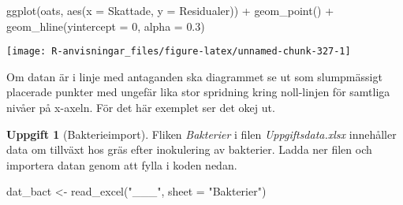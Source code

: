 \documentclass[
]{book}
\newenvironment{Shaded}{\begin{snugshade}}{\end{snugshade}}
\newcommand{\AttributeTok}[1]{\textcolor[rgb]{0.77,0.63,0.00}{#1}}
\newcommand{\DecValTok}[1]{\textcolor[rgb]{0.00,0.00,0.81}{#1}}
\newcommand{\FloatTok}[1]{\textcolor[rgb]{0.00,0.00,0.81}{#1}}
\newcommand{\FunctionTok}[1]{\textcolor[rgb]{0.00,0.00,0.00}{#1}}
\newcommand{\NormalTok}[1]{#1}
\newcommand{\OtherTok}[1]{\textcolor[rgb]{0.56,0.35,0.01}{#1}}
\newcommand{\SpecialCharTok}[1]{\textcolor[rgb]{0.00,0.00,0.00}{#1}}
\newcommand{\StringTok}[1]{\textcolor[rgb]{0.31,0.60,0.02}{#1}}
\theoremstyle{definition}
\theoremstyle{definition}
\theoremstyle{definition}
\newtheorem{exercise}{Uppgift}[chapter]
\theoremstyle{definition}
\theoremstyle{remark}
\begin{document}
\begin{Shaded}
\begin{Highlighting}[]
\FunctionTok{ggplot}\NormalTok{(oats, }\FunctionTok{aes}\NormalTok{(}\AttributeTok{x =}\NormalTok{ Skattade, }\AttributeTok{y =}\NormalTok{ Residualer)) }\SpecialCharTok{+}
  \FunctionTok{geom\_point}\NormalTok{() }\SpecialCharTok{+}
  \FunctionTok{geom\_hline}\NormalTok{(}\AttributeTok{yintercept =} \DecValTok{0}\NormalTok{, }\AttributeTok{alpha =} \FloatTok{0.3}\NormalTok{)}
\end{Highlighting}
\end{Shaded}

\begin{center}\texttt{[image: R-anvisningar\_files/figure-latex/unnamed-chunk-327-1]} \end{center}

Om datan är i linje med antaganden ska diagrammet se ut som slumpmässigt placerade punkter med ungefär lika stor spridning kring noll-linjen för samtliga nivåer på x-axeln. För det här exemplet ser det okej ut.

\begin{exercise}[Bakterieimport]

Fliken \emph{Bakterier} i filen \emph{Uppgiftsdata.xlsx} innehåller data om tillväxt hos gräs efter inokulering av bakterier. Ladda ner filen och importera datan genom att fylla i koden nedan.

\begin{Shaded}
\begin{Highlighting}[]
\NormalTok{dat\_bact }\OtherTok{\textless{}{-}} \FunctionTok{read\_excel}\NormalTok{(}\StringTok{"\_\_\_"}\NormalTok{, }\AttributeTok{sheet =} \StringTok{"Bakterier"}\NormalTok{)}
\end{Highlighting}
\end{Shaded}

\end{exercise}
\end{document}

